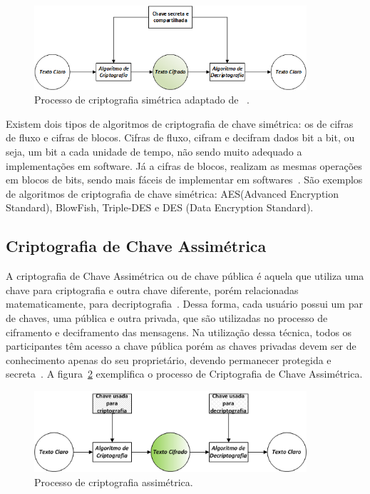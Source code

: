 \begin{figure}[!htb]
\centering
\includegraphics[width=0.9\textwidth]{criptosimetrico.png}
\caption{Processo de criptografia simétrica adaptado de ~\cite{stallings2008}.}
\label{fig:criptografiasimetrica}
\end{figure}

Existem dois tipos de algoritmos de criptografia de chave simétrica: os de cifras de fluxo e cifras de blocos. Cifras de fluxo, cifram e decifram dados bit a bit, ou seja, um bit a cada unidade de tempo, não sendo muito adequado a implementações em software. Já a cifras de blocos, realizam as mesmas operações em blocos de bits, sendo mais fáceis de implementar em softwares~\cite{Schneier1995}. São exemplos de algoritmos de criptografia de chave simétrica: AES(Advanced Encryption Standard), BlowFish, Triple-DES e DES (Data Encryption Standard).



\subsection{Criptografia de Chave Assimétrica}

A criptografia de Chave Assimétrica ou de chave pública é aquela que utiliza uma chave para criptografia e outra chave diferente, porém relacionadas matematicamente, para decriptografia~\cite{stallings2008}. Dessa forma, cada usuário possui um par de chaves, uma pública e outra privada, que são utilizadas no processo de ciframento e deciframento das mensagens. Na utilização dessa técnica, todos os participantes têm acesso a chave pública porém as chaves privadas devem ser de conhecimento apenas do seu proprietário, devendo permanecer protegida e secreta~\cite{stallings2008}. A figura~\ref{fig:criptografiaassimetrica} exemplifica o processo de Criptografia de Chave Assimétrica.

\begin{figure}[!htb]
\centering
\includegraphics[width=0.9\textwidth]{criptografiaassimetrica.png}
\caption{Processo de criptografia assimétrica.}
\label{fig:criptografiaassimetrica}
\end{figure}


